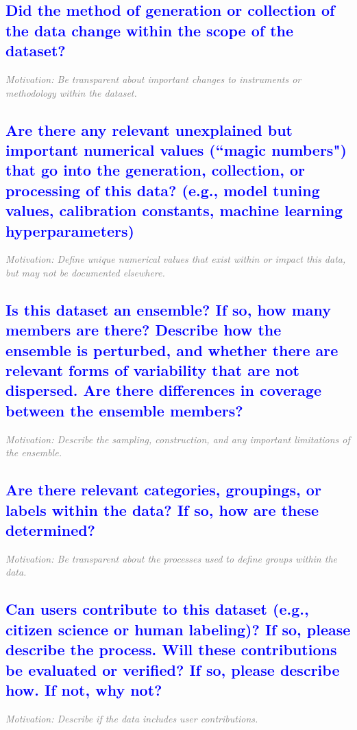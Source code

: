 \documentclass[letterpaper, 10 pt, transmag]{IEEEtran}
\begin{document}
\textcolor{blue}{\subsection{Did the method of generation or collection of the data change within the scope of the dataset?}}
\textcolor{gray}{\textit{Motivation: Be transparent about important changes to instruments or methodology within the dataset.}} %

\textcolor{blue}{\subsection{Are there any relevant unexplained but important numerical values (``magic numbers") that go into the generation, collection, or processing of this data? (e.g., model tuning values, calibration constants, machine learning hyperparameters)}}
\textcolor{gray}{\textit{Motivation: Define unique numerical values that exist within or impact this data, but may not be documented elsewhere.}}

\textcolor{blue}{\subsection{Is this dataset an ensemble? If so, how many members are there? Describe how the ensemble is perturbed, and whether there are relevant forms of variability that are not dispersed. Are there differences in coverage between the ensemble members?}}
\textcolor{gray}{\textit{Motivation: Describe the sampling, construction, and any important limitations of the ensemble.}}

\textcolor{blue}{\subsection{Are there relevant categories, groupings, or labels within the data? If so, how are these determined?}}
\textcolor{gray}{\textit{Motivation: Be transparent about the processes used to define groups within the data.}}

\textcolor{blue}{\subsection{Can users contribute to this dataset (e.g., citizen science or human labeling)? If so, please describe the process. Will these contributions be evaluated or verified? If so, please describe how. If not, why not?}}
\textcolor{gray}{\textit{Motivation: Describe if the data includes user contributions.}}
\end{document}
